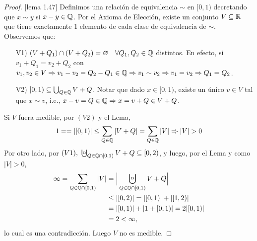 \begin{proof}[Proof][lema 1.47]
	Definimos una relación de equivalencia $\sim$ en $[0,1)$ decretando que $x \sim y$ si $x-y \in \mathbb{Q}$. Por el Axioma de Elección, existe un conjunto $V \subseteq \mathbb{R}$ que tiene exactamente $1$ elemento de cada clase de equivalencia de $\sim$. Observemos que:
	\begin{enumerate}
		\item[V1)] $(V + Q_1) \cap (V + Q_2) = \varnothing \quad \forall Q_1,Q_2 \in \mathbb{Q}$ distintos. En efecto, si $v_1 + Q_1 = v_2 + Q_2$ con $v_1,v_2 \in V \Rightarrow v_1 - v_2 = Q_2 - Q_1 \in \mathbb{Q} \Rightarrow v_1 \sim v_2 \Rightarrow v_1 = v_2 \Rightarrow Q_1 = Q_2$.

		\item[V2)] $[0,1) \subseteq \bigcup_{Q \in \mathbb{Q}} V + Q$. Notar que dado $x\in[0,1)$, existe un único $v \in V$ tal que $x \sim v$, i.e., $x-v = Q \in \mathbb{Q} \Rightarrow x = v + Q \in V + Q$.
	\end{enumerate}
	Si $V$ fuera medible, por $(V2)$ y el Lema,
	\[ 1 = = |[0,1)| \leq \sum_{Q \in \mathbb{Q}} |V+Q| = \sum_{Q\in\mathbb{Q}} |V| \Rightarrow |V| > 0 \]
	Por otro lado, por $(V1),\ \textbigcupd_{Q \in \Q \cap [0,1)} V+Q \subseteq [0,2)$, y luego, por el Lema y como $|V| > 0$,
	\begin{align*}
		\infty = \sum_{Q \in \Q \cap [0,1)} |V| &= \Big| \bigcupd_{Q\in\Q\cap[0,1)} V+Q \Big| \\
		& \leq |[0,2)| = |[0,1)| + |[1,2)| \\
		&= |[0,1)| + | 1 + [0,1)| = 2|[0,1)| \\
		&= 2 < \infty
	,\end{align*}
	lo cual es una contradicción. Luego $V$ no es medible.
\end{proof}
